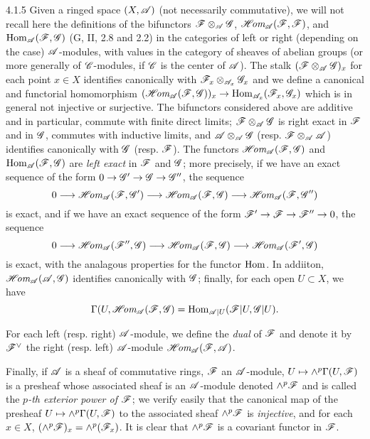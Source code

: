 \begin{env}{4.1.5}
\label{env-0.4.1.5}
Given a ringed space $(X,\mathscr{A})$ (not necessarily commutative), we will not recall here the
definitions of the bifunctors $\mathscr{F}\otimes_\mathscr{A}\mathscr{G}$,
$\mathscr{H}\!\textit{om}_\mathscr{A}(\mathscr{F},\mathscr{F})$, and ${\mathop{\mathrm{Hom}}\nolimits}_\mathscr{A}(\mathscr{F},\mathscr{G})$ (G, II, 2.8 and 2.2) in
the categories of left or right (depending on the case) $\mathscr{A}$-modules, with values in the
category of sheaves of abelian groups (or more generally of $\mathscr{C}$-modules, if $\mathscr{C}$ is
the center of $\mathscr{A}$). The stalk $(\mathscr{F}\otimes_\mathscr{A}\mathscr{G})_x$ for each point $x\in X$
identifies canonically with $\mathscr{F}_x\otimes_{\mathscr{A}_x}\mathscr{G}_x$ and we define a canonical
and functorial homomorphism
$(\mathscr{H}\!\textit{om}_\mathscr{A}(\mathscr{F},\mathscr{G}))_x\to{\mathop{\mathrm{Hom}}\nolimits}_{\mathscr{A}_x}(\mathscr{F}_x,\mathscr{G}_x)$ which is in general
not injective or surjective. The bifunctors considered above are additive and in particular,
commute with finite direct limits; $\mathscr{F}\otimes_\mathscr{A}\mathscr{G}$ is right exact in $\mathscr{F}$
and in $\mathscr{G}$, commutes with inductive limits, and $\mathscr{A}\otimes_\mathscr{A}\mathscr{G}$ (resp.
$\mathscr{F}\otimes_\mathscr{A}\mathscr{A}$) identifies canonically with $\mathscr{G}$ (resp. $\mathscr{F}$). The
functors $\mathscr{H}\!\textit{om}_\mathscr{A}(\mathscr{F},\mathscr{G})$ and ${\mathop{\mathrm{Hom}}\nolimits}_\mathscr{A}(\mathscr{F},\mathscr{G})$ are \emph{left
exact} in $\mathscr{F}$ and $\mathscr{G}$; more precisely, if we have an exact sequence of the form
$0\to\mathscr{G}'\to\mathscr{G}\to\mathscr{G}''$, the sequence
\[
  0\longrightarrow\mathscr{H}\!\textit{om}_\mathscr{A}(\mathscr{F},\mathscr{G}')\longrightarrow
  \mathscr{H}\!\textit{om}_\mathscr{A}(\mathscr{F},\mathscr{G})\longrightarrow\mathscr{H}\!\textit{om}_\mathscr{A}(\mathscr{F},\mathscr{G}'')
\]
is exact, and if we have an exact sequence of the form $\mathscr{F}'\to\mathscr{F}\to\mathscr{F}''\to 0$,
the sequence
\[
  0\longrightarrow\mathscr{H}\!\textit{om}_\mathscr{A}(\mathscr{F}'',\mathscr{G})\longrightarrow
  \mathscr{H}\!\textit{om}_\mathscr{A}(\mathscr{F},\mathscr{G})\longrightarrow\mathscr{H}\!\textit{om}_\mathscr{A}(\mathscr{F}',\mathscr{G})
\]
is exact, with the analagous properties for the functor ${\mathop{\mathrm{Hom}}\nolimits}$. In addiiton,
$\mathscr{H}\!\textit{om}_\mathscr{A}(\mathscr{A},\mathscr{G})$ identifies canonically with $\mathscr{G}$; finally, for each open
$U\subset X$, we have
\[
  \Gamma(U,\mathscr{H}\!\textit{om}_\mathscr{A}(\mathscr{F},\mathscr{G})={\mathop{\mathrm{Hom}}\nolimits}_{\mathscr{A}|U}(\mathscr{F}|U,\mathscr{G}|U).
\]

For each left (resp. right) $\mathscr{A}$-module, we define the \emph{dual} of $\mathscr{F}$ and
denote it by ${\mathscr{F}}^\vee$ the right (resp. left) $\mathscr{A}$-module
$\mathscr{H}\!\textit{om}_\mathscr{A}(\mathscr{F},\mathscr{A})$.

Finally, if $\mathscr{A}$ is a sheaf of commutative rings, $\mathscr{F}$ an $\mathscr{A}$-module,
$U\mapsto\wedge^p\Gamma(U,\mathscr{F})$ is a presheaf whose associated sheaf is an $\mathscr{A}$-module
denoted $\wedge^p\mathscr{F}$ and is called the \emph{$p$-th exterior power of $\mathscr{F}$}; we
verify easily that the canonical map of the presheaf $U\mapsto\wedge^p\Gamma(U,\mathscr{F})$ to
the associated sheaf $\wedge^p\mathscr{F}$ is \emph{injective}, and for each $x\in X$,
$(\wedge^p\mathscr{F})_x=\wedge^p(\mathscr{F}_x)$. It is clear that $\wedge^p\mathscr{F}$ is a covariant
functor in $\mathscr{F}$.
\end{env}

